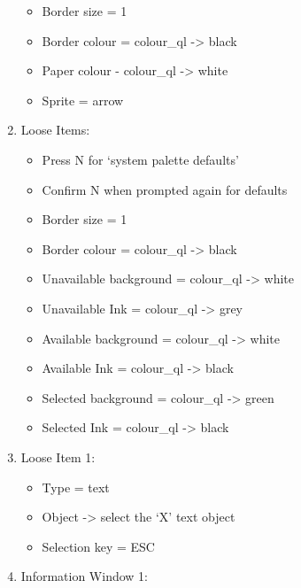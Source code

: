 \begin{enumerate}
{\begin{itemize}[itemsep=0pt]
\item{}Border size = 1

\item{}Border colour = colour\_ql -{}>{} black

\item{}Paper colour -{} colour\_ql -{}>{} white

\item{}Sprite = arrow

\end{itemize}
}
\item{Loose Items:
\begin{itemize}[itemsep=0pt]

\item{}Press N for `system palette defaults'

\item{}Confirm N when prompted again for defaults

\item{}Border size = 1

\item{}Border colour = colour\_ql -{}>{} black

\item{}Unavailable background = colour\_ql -{}>{} white

\item{}Unavailable Ink = colour\_ql -{}>{} grey

\item{}Available background = colour\_ql -{}>{} white

\item{}Available Ink = colour\_ql -{}>{} black

\item{}Selected background = colour\_ql -{}>{} green

\item{}Selected Ink = colour\_ql -{}>{} black

\end{itemize}
}
\item{Loose Item 1:
\begin{itemize}[itemsep=0pt]

\item{}Type = text

\item{}Object -{}>{} select the `X' text object

\item{}Selection key = ESC

\end{itemize}
}
\item{Information Window 1:
\begin{itemize}[itemsep=0pt]


\end{itemize}}
\end{enumerate}
